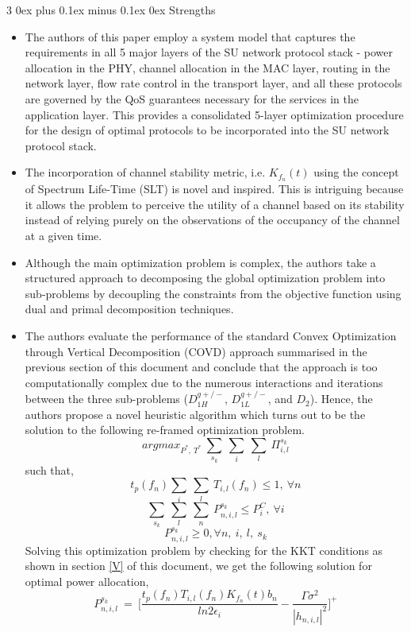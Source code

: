 \documentclass[12pt, draftcls, onecolumn]{IEEEtran}
\makeatletter
\def\subsubsection{\@startsection{subsubsection}%
                                 {3}%
                                 {\z@}%
                                 {0ex plus 0.1ex minus 0.1ex}%
                                 {0ex}%
                                 {\normalfont\normalsize\bfseries}}%
\makeatother
\begin{document}
\subsubsection{Strengths}
\begin{itemize}
    \item The authors of this paper employ a system model that captures the requirements in all 5 major layers of the SU network protocol stack - power allocation in the PHY, channel allocation in the MAC layer, routing in the network layer, flow rate control in the transport layer, and all these protocols are governed by the QoS guarantees necessary for the services in the application layer. This provides a consolidated 5-layer optimization procedure for the design of optimal protocols to be incorporated into the SU network protocol stack.
    \item The incorporation of channel stability metric, i.e. $K_{f_n}(t)$ using the concept of Spectrum Life-Time (SLT) is novel and inspired. This is intriguing because it allows the problem to perceive the utility of a channel based on its stability instead of relying purely on the observations of the occupancy of the channel at a given time.
    \item Although the main optimization problem is complex, the authors take a structured approach to decomposing the global optimization problem into sub-problems by decoupling the constraints from the objective function using dual and primal decomposition techniques.
    \item The authors evaluate the performance of the standard Convex Optimization through Vertical Decomposition (COVD) approach summarised in the previous section of this document and conclude that the approach is too computationally complex due to the numerous interactions and iterations between the three sub-problems ($D_{1H}^{g+/-}$, $D_{1L}^{g+/-}$, and $D_2$). Hence, the authors propose a novel heuristic algorithm which turns out to be the solution to the following re-framed optimization problem.
    \[argmax_{P^*,\ T^*}\ \sum_{s_k}\ \sum_{i}\ \sum_{l}\ \Pi_{i,l}^{s_k}\]
    such that,
    \[t_p(f_n)\sum_i\ \sum_l\ T_{i,l}(f_n) \leq 1,\ \forall n\]
    \[\sum_{s_k}\ \sum_{l}\ \sum_{n}\ P_{n,i,l}^{s_k} \leq P_i^C,\ \forall i\]
    \[P_{n,i,l}^{s_k} \geq 0, \forall n,\ i,\ l,\ s_k\]
    Solving this optimization problem by checking for the KKT conditions as shown in section \ref{V} of this document, we get the following solution for optimal power allocation,
    \[P_{n,i,l}^{s_k}\ =\ \Big[\frac{t_p(f_n)T_{i,l}(f_n)K_{f_n}(t)b_n}{ln 2 \epsilon_i} - \frac{\Gamma \sigma^2}{|h_{n,i,l}|^2}\Big]^+\]

\end{itemize}
\end{document}
